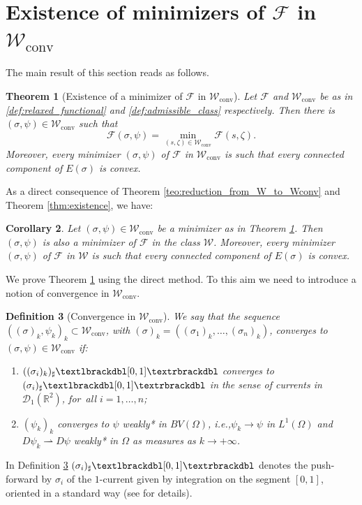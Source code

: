 \documentclass[11pt]{article}
\newcommand{\ie}{i.e.,\xspace}
\numberwithin{equation}{section}
\newcommand{\R}{\mathbb{R}}
\newcommand{\largercomp}{\mathcal W}
\let\sigmamin\sigma
\let\psimin\psi
\newcommand\admclassconv{{\mathcal W_\mathrm{conv}}}
\newcommand{\jump}[1]{\textup{\textlbrackdbl}{#1}\textup{\textrbrackdbl}}
\newtheorem{theorem}{Theorem}[section]
\newtheorem{definition}[theorem]{Definition}
\newtheorem{cor}[theorem]{Corollary}
\theoremstyle{definition}
\begin{document}
\section{Existence of minimizers of \texorpdfstring{$\mathcal F$ in $\admclassconv$}{FW}}

\label{sec:existence_of_minimizers_of_F_in_Wconv}
The main result of this section reads as follows.

\begin{theorem}[Existence of a minimizer of $\mathcal F$ in $\admclassconv$]\label{thm:existence}
Let $\mathcal F$ and $\admclassconv$ be as in \eqref{def:relaxed_functional}
and \eqref{def:admissible_class} respectively. Then there
is $(\sigma, \psi)\in\admclassconv$ such that
\begin{equation}\label{eq:min_F_storto}
\mathcal F(\sigma,\psi)=
\min_{(s,\zeta)\in\admclassconv}\mathcal F(s,\zeta).
\end{equation}
Moreover, every minimizer $(\sigma, \psi)$ of $\mathcal F$ in $\admclassconv$ is such that every connected component of $E(\sigma)$ is convex.
\end{theorem}
As a direct consequence of Theorem \ref{teo:reduction_from_W_to_Wconv} and Theorem \eqref{thm:existence}, we have:

\begin{cor}\label{cor:mininmathcalW}
Let $(\sigmamin,\psimin)\in\admclassconv$ be a minimizer as in Theorem \ref{thm:existence}. Then $(\sigmamin,\psimin)$ is also a minimizer of ${\mathcal F}$ in the class $\largercomp$. Moreover, every minimizer $(\sigma, \psi)$ of $\mathcal F$ in $\mathcal W$ is such that every connected component of $E(\sigma)$ is convex.
\end{cor}

We prove Theorem \ref{thm:existence} using the direct method. To this aim
we need to introduce a notion of convergence in $\admclassconv$.
\begin{definition}[Convergence in $\admclassconv$]
\label{def:conv}
We say that the sequence $((\sigma)_k,\psi_k)_k\subset \admclassconv
$, with $(\sigma)_k=((\sigma_1)_k,\dots,(\sigma_n)_k)$, converges to $(\sigma,\psi)\in \admclassconv$ if:
\begin{enumerate}[{\rm (a)},wide]
\item\label{a}
$((\sigma_{i})_k)_\sharp\jump{[0,1]}$ converges to
$(\sigma_i)_\sharp \jump{[0,1]}$ in the sense of currents in $\mathcal D_1(\R^2)$,
for~all $i=1,\dots,n$;
\item \label{b} $(\psi_k)_k$ converges
to $\psi$ weakly* in $BV(\Omega)$, \ie $\psi_k \to \psi$ in $L^1(\Omega)$ and
$D \psi_k \rightharpoonup D\psi$ weakly* in $\Omega$
as measures as
$k \to +\infty$.
\end{enumerate}
\end{definition}
In Definition \ref{def:conv} $(\sigma_i)_\sharp\jump{[0,1]}$ denotes the push-forward by $\sigma_i$ of the $1$-current given by integration on the segment $[0,1]$, oriented in a standard way (see \cite{Krantz-Parks} for details).
\end{document}
